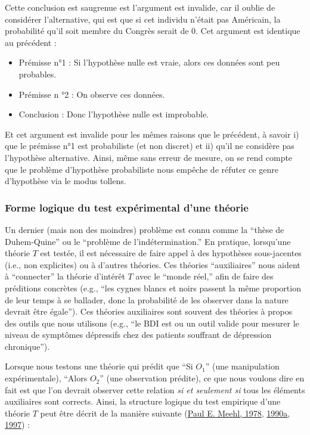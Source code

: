 \documentclass[
  a4paper,11pt,twoside,onecolumn,openright,final,oldfontcommands]{memoir}
\theoremstyle{definition}
\theoremstyle{definition}
\theoremstyle{definition}
\theoremstyle{remark}
\begin{document}
Cette conclusion est saugrenue est l'argument est invalide, car il oublie de considérer l'alternative, qui est que si cet individu n'était pas Américain, la probabilité qu'il soit membre du Congrès serait de 0. Cet argument est identique au précédent :

\begin{itemize}
\item
  Prémisse n°1 : Si l'hypothèse nulle est vraie, alors ces données sont peu probables.
\item
  Prémisse n °2 : On observe ces données.
\item
  Conclusion : Donc l'hypothèse nulle est improbable.
\end{itemize}

Et cet argument est invalide pour les mêmes raisons que le précédent, à savoir i) que le prémisse n°1 est probabiliste (et non discret) et ii) qu'il ne considère pas l'hypothèse alternative. Ainsi, même sans erreur de mesure, on se rend compte que le problème d'hypothèse probabiliste nous empêche de réfuter ce genre d'hypothèse via le modus tollens.

\hypertarget{forme-logique-du-test-expuxe9rimental-dune-thuxe9orie}{%
\subsubsection{Forme logique du test expérimental d'une théorie}\label{forme-logique-du-test-expuxe9rimental-dune-thuxe9orie}}

Un dernier (mais non des moindres) problème est connu comme la ``thèse de Duhem-Quine'' ou le ``problème de l'indétermination.'' En pratique, lorsqu'une théorie \(T\) est testée, il est nécessaire de faire appel à des hypothèses sous-jacentes (i.e., non explicites) ou à d'autres théories. Ces théories ``auxiliaires'' nous aident à ``connecter'' la théorie d'intérêt \(T\) avec le ``monde réel,'' afin de faire des préditions concrètes (e.g., ``les cygnes blancs et noirs passent la même proportion de leur temps à se ballader, donc la probabilité de les observer dans la nature devrait être égale''). Ces théories auxiliaires sont souvent des théories à propos des outils que nous utilisons (e.g., ``le BDI est ou un outil valide pour mesurer le niveau de symptômes dépressifs chez des patients souffrant de dépression chronique'').

Lorsque nous testons une théorie qui prédit que ``Si \(O_{1}\)'' (une manipulation expérimentale), ``Alors \(O_{2}\)'' (une observation prédite), ce que nous voulons dire en fait est que l'on devrait observer cette relation \emph{si et seulement si} tous les éléments auxiliaires sont corrects. Ainsi, la structure logique du test empirique d'une théorie \(T\) peut être décrit de la manière suivante (\protect\hyperlink{ref-meehl_theoretical_1978}{Paul E. Meehl, 1978}, \protect\hyperlink{ref-meehl_appraising_1990}{1990a}, \protect\hyperlink{ref-harlow_problem_1997}{1997}) :
\end{document}
